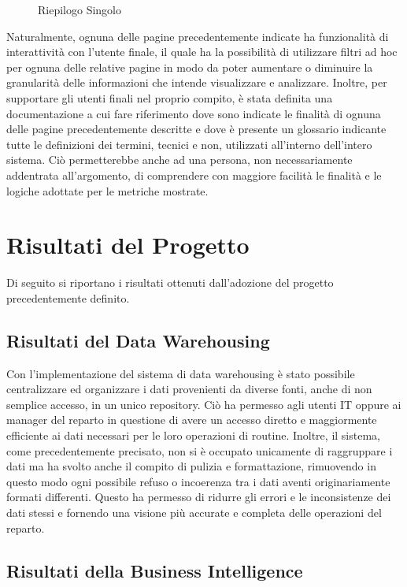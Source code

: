 \begin{enumerate}
\begin{figure}[H]
        \caption{Riepilogo Singolo}
        \label{fig:BI Call Report-4}
        \end{figure}
\end{enumerate}

Naturalmente, ognuna delle pagine precedentemente indicate ha funzionalità di interattività con l'utente finale, il quale ha la possibilità di utilizzare filtri ad hoc per ognuna delle relative pagine in modo da poter aumentare o diminuire la granularità delle informazioni che intende visualizzare e analizzare.
Inoltre, per supportare gli utenti finali nel proprio compito, è stata definita una documentazione a cui fare riferimento dove sono indicate le finalità di ognuna delle pagine precedentemente descritte e dove è presente un glossario indicante tutte le definizioni dei termini, tecnici e non, utilizzati all'interno dell'intero sistema. Ciò permetterebbe anche ad una persona, non necessariamente addentrata all'argomento, di comprendere con maggiore facilità le finalità e le logiche adottate per le metriche mostrate.

\section{Risultati del Progetto}

Di seguito si riportano i risultati ottenuti dall'adozione del progetto precedentemente definito.

\subsection{Risultati del Data Warehousing}
Con l'implementazione del sistema di data warehousing è stato possibile centralizzare ed organizzare i dati provenienti da diverse fonti, anche di non semplice accesso, in un unico repository. Ciò ha permesso agli utenti IT oppure ai manager del reparto in questione di avere un accesso diretto e maggiormente efficiente ai dati necessari per le loro operazioni di routine. Inoltre, il sistema, come precedentemente precisato, non si è occupato unicamente di raggruppare i dati ma ha svolto anche il compito di pulizia e formattazione, rimuovendo in questo modo ogni possibile refuso o incoerenza tra i dati aventi originariamente formati differenti. Questo ha permesso di ridurre gli errori e le inconsistenze dei dati stessi e fornendo una visione più accurate e completa delle operazioni del reparto.

\subsection{Risultati della Business Intelligence}

